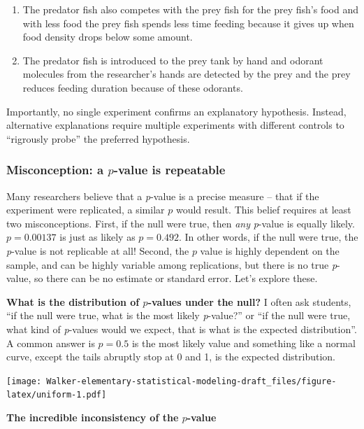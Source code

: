 \documentclass[]{book}
\providecommand{\tightlist}{%
  \setlength{\itemsep}{0pt}\setlength{\parskip}{0pt}}
\begin{document}
\begin{enumerate}
\def\labelenumi{\arabic{enumi}.}
\tightlist
\item
  The predator fish also competes with the prey fish for the prey fish's
  food and with less food the prey fish spends less time feeding because
  it gives up when food density drops below some amount.
\item
  The predator fish is introduced to the prey tank by hand and odorant
  molecules from the researcher's hands are detected by the prey and the
  prey reduces feeding duration because of these odorants.
\end{enumerate}

Importantly, no single experiment confirms an explanatory hypothesis.
Instead, alternative explanations require multiple experiments with
different controls to ``rigrously probe'' the preferred hypothesis.

\subsubsection{\texorpdfstring{Misconception: a \(p\)-value is
repeatable}{Misconception: a p-value is repeatable}}\label{misconception-a-p-value-is-repeatable}

Many researchers believe that a \emph{p}-value is a precise measure --
that if the experiment were replicated, a similar \(p\) would result.
This belief requires at least two misconceptions. First, if the null
were true, then \emph{any} \emph{p}-value is equally likely.
\(p=0.00137\) is just as likely as \(p=0.492\). In other words, if the
null were true, the \emph{p}-value is not replicable at all! Second, the
\(p\) value is highly dependent on the sample, and can be highly
variable among replications, but there is no true \emph{p}-value, so
there can be no estimate or standard error. Let's explore these.

\textbf{What is the distribution of \(p\)-values under the null?} I
often ask students, ``if the null were true, what is the most likely
\emph{p}-value?'' or ``if the null were true, what kind of
\emph{p}-values would we expect, that is what is the expected
distribution''. A common answer is \(p=0.5\) is the most likely value
and something like a normal curve, except the tails abruptly stop at 0
and 1, is the expected distribution.

\texttt{[image: Walker-elementary-statistical-modeling-draft\_files/figure-latex/uniform-1.pdf]}

\textbf{The incredible inconsistency of the \(p\)-value}
\end{document}

